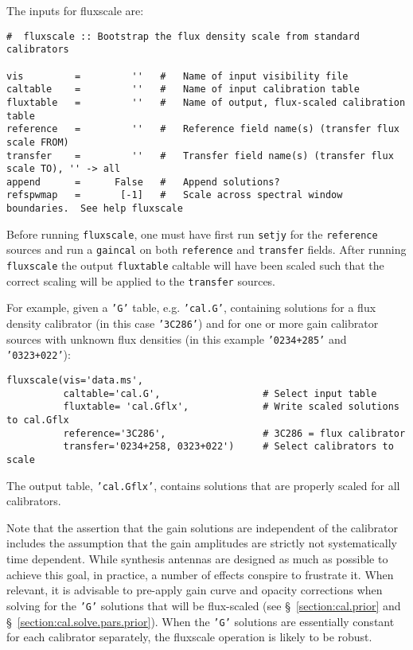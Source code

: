 The inputs for fluxscale are:
\small
\begin{verbatim}
#  fluxscale :: Bootstrap the flux density scale from standard calibrators

vis         =         ''   #   Name of input visibility file
caltable    =         ''   #   Name of input calibration table
fluxtable   =         ''   #   Name of output, flux-scaled calibration table
reference   =         ''   #   Reference field name(s) (transfer flux scale FROM)
transfer    =         ''   #   Transfer field name(s) (transfer flux scale TO), '' -> all
append      =      False   #   Append solutions?
refspwmap   =       [-1]   #   Scale across spectral window boundaries.  See help fluxscale
\end{verbatim}
\normalsize

Before running {\tt fluxscale}, one must have first run {\tt setjy} for the
{\tt reference} sources and run a {\tt gaincal} on both {\tt reference}
and {\tt transfer} fields.  After running {\tt fluxscale} the output
{\tt fluxtable} caltable will have been scaled such that the correct
scaling will be applied to the {\tt transfer} sources.

For example, given a {\tt 'G'} table, e.g. {\tt 'cal.G'},
containing solutions for a flux density calibrator (in this case 
{\tt '3C286'}) and for one or more gain calibrator sources with
unknown flux densities (in this example {\tt '0234+285'} and 
{\tt '0323+022'}):
\small
\begin{verbatim}
fluxscale(vis='data.ms',
          caltable='cal.G',                  # Select input table
          fluxtable= 'cal.Gflx',             # Write scaled solutions to cal.Gflx
          reference='3C286',                 # 3C286 = flux calibrator
          transfer='0234+258, 0323+022')     # Select calibrators to scale
\end{verbatim}
\normalsize
The output table, {\tt 'cal.Gflx'}, contains solutions that are properly scaled
for all calibrators.

Note that the assertion that the gain solutions are independent of the
calibrator includes the assumption that the gain amplitudes are
strictly not systematically time dependent.  While synthesis antennas
are designed as much as possible to achieve this goal, in practice, a
number of effects conspire to frustrate it.  When relevant, it is
advisable to pre-apply gain curve and opacity corrections when solving
for the {\tt 'G'} solutions that will be flux-scaled (see 
\S~\ref{section:cal.prior} and \S~\ref{section:cal.solve.pars.prior}).
When the {\tt 'G'} solutions are essentially constant for each
calibrator separately, the fluxscale operation is likely to be robust.

